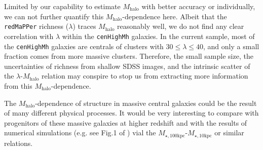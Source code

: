 \documentclass{emulateapj}
\def\redm{\texttt{redMaPPer}}
\def\rbcg{\texttt{cenHighMh}}
\def\mhalo{{$M_{\mathrm{halo}}$}}
\def\minn{{$M_{\star,10\mathrm{kpc}}$}}
\def\mtot{{$M_{\star,100\mathrm{kpc}}$}}
\newcommand{\update}[1]{\textcolor{Bittersweet}{#1}}
\begin{document}
\begin{CJK*}{UTF8}{gbsn}
    \update{
    Limited by our capability to estimate \mhalo{} with better accuracy or individually, 
    we can not further quantify this \mhalo{}-dependence here.
    Albeit that the \redm{} richness ($\lambda$) traces \mhalo{} reasonably well, 
    we do not find any clear correlation with $\lambda$ within the \rbcg{} galaxies.
    }
    In the current sample, most of the \rbcg{} galaxies are centrals of clusters with 
    $30 \leq \lambda \leq 40$, and only a small fraction comes from more massive clusters.  
    Therefore, the small sample size, the uncertainties of richness from shallow SDSS
    images, and the intrinsic scatter of the $\lambda$-\mhalo{} relation may conspire to 
    stop us from extracting more information from this \mhalo{}-dependence.
    
    \update{
    The \mhalo{}-dependence of structure in massive central galaxies could be the result 
    of many different physical processes. 
    It would be very interesting to compare with progenitors of these massive 
    galaxies at higher redshift and with the results of numerical simulations (e.g. see 
    Fig.1 of \citealt{Wellons2016b}) vial the \mtot{}-\minn{} or similar relations.
    }
     


\end{CJK*}
\end{document}
